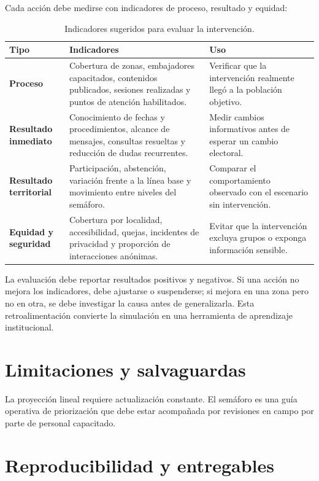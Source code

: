 \documentclass[11pt,a4paper]{article}
\begin{document}
Cada acción debe medirse con indicadores de proceso, resultado y equidad:
\begin{table}[H]
\centering
\caption{Indicadores sugeridos para evaluar la intervención.}
\label{tab:indicadores_intervencion}
\begin{tabularx}{\textwidth}{>{\bfseries}p{}p{}X}
\toprule
\textbf{Tipo} & \textbf{Indicadores} & \textbf{Uso}\\
\midrule
Proceso & Cobertura de zonas, embajadores capacitados, contenidos publicados, sesiones realizadas y puntos de atención habilitados. & Verificar que la intervención realmente llegó a la población objetivo.\\
Resultado inmediato & Conocimiento de fechas y procedimientos, alcance de mensajes, consultas resueltas y reducción de dudas recurrentes. & Medir cambios informativos antes de esperar un cambio electoral.\\
Resultado territorial & Participación, abstención, variación frente a la línea base y movimiento entre niveles del semáforo. & Comparar el comportamiento observado con el escenario sin intervención.\\
Equidad y seguridad & Cobertura por localidad, accesibilidad, quejas, incidentes de privacidad y proporción de interacciones anónimas. & Evitar que la intervención excluya grupos o exponga información sensible.\\
\bottomrule
\end{tabularx}
\end{table}

La evaluación debe reportar resultados positivos y negativos. Si una acción no mejora los indicadores, debe ajustarse o suspenderse; si mejora en una zona pero no en otra, se debe investigar la causa antes de generalizarla. Esta retroalimentación convierte la simulación en una herramienta de aprendizaje institucional.

\section{Limitaciones y salvaguardas}

La proyección lineal requiere actualización constante. El semáforo es una guía operativa de priorización que debe estar acompañada por revisiones en campo por parte de personal capacitado.

\section{Reproducibilidad y entregables}
\end{document}
